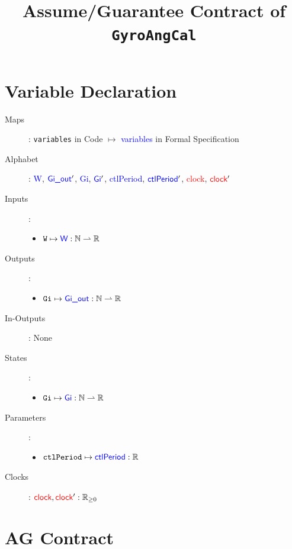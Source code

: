 \documentclass[fleqn,a4paper]{article}
\newcommand\var[1]{\texttt{#1}}
\newcommand\Var[1]{\textcolor{blue}{\textsf{#1}}}
\newcommand\clock{\textcolor{red}{\textsf{clock}}}
\begin{document}
\title{Assume/Guarantee Contract of \texttt{GyroAngCal}}
\author{}

\maketitle

\section{Variable Declaration}

\begin{description}
\item[Maps]:
\var{variables} in Code $\mapsto$ \Var{variables} in Formal Specification

\item[Alphabet]:
\Var{W},
$\Var{Gi\_out}'$,
\Var{Gi},
$\Var{Gi}'$,
\Var{ctlPeriod},
$\Var{ctlPeriod}'$,
\clock,
$\clock'$

\item[Inputs]:
\begin{itemize}
\item $\var{W} \mapsto \Var{W} : \mathbb{N} \rightharpoonup \mathbb{R}$
\end{itemize}

\item[Outputs]:
\begin{itemize}
\item $\var{Gi} \mapsto \Var{Gi\_out} : \mathbb{N} \rightharpoonup \mathbb{R}$
\end{itemize}

\item[In-Outputs]: None

\item[States]:
\begin{itemize}
\item $\var{Gi} \mapsto \Var{Gi} : \mathbb{N} \rightharpoonup \mathbb{R}$
\end{itemize}

\item[Parameters]:
\begin{itemize}
\item $\var{ctlPeriod} \mapsto \Var{ctlPeriod} : \mathbb{R}$
\end{itemize}

\item[Clocks]:
$\clock,\clock' : \mathbb{R}_{\geq 0}$

\end{description}

\section{AG Contract}
\end{document}

